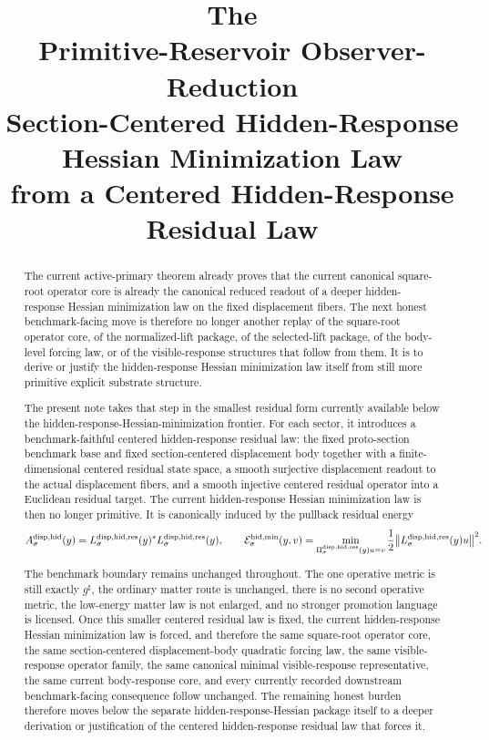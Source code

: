 \documentclass[11pt]{article}
\title{\textbf{The \TheoryName{}}\\[0.4em]
\large Primitive-Reservoir Observer-Reduction\\
\large Section-Centered Hidden-Response\\
\large Hessian Minimization Law\\
\large from a Centered Hidden-Response\\
\large Residual Law}
\author{}
\date{}
\newcommand{\CompletedMetric}{g^{\sharp}}
\newcommand{\HiddenHessian}[1]{A_{#1}^{\mathrm{disp,hid}}}
\newcommand{\HiddenMinEnergy}[1]{\mathcal E_{#1}^{\mathrm{hid,min}}}
\newcommand{\ResidualReadout}[1]{\Pi_{#1}^{\mathrm{disp,hid,res}}}
\newcommand{\ResidualOperator}[1]{L_{#1}^{\mathrm{disp,hid,res}}}
\begin{document}
\maketitle

\begin{abstract}
The current active-primary theorem already proves that the current canonical square-root operator core is already the canonical reduced readout of a deeper hidden-response Hessian minimization law on the fixed displacement fibers. The next honest benchmark-facing move is therefore no longer another replay of the square-root operator core, of the normalized-lift package, of the selected-lift package, of the body-level forcing law, or of the visible-response structures that follow from them. It is to derive or justify the hidden-response Hessian minimization law itself from still more primitive explicit substrate structure.

The present note takes that step in the smallest residual form currently available below the hidden-response-Hessian-minimization frontier. For each sector, it introduces a benchmark-faithful centered hidden-response residual law: the fixed proto-section benchmark base and fixed section-centered displacement body together with a finite-dimensional centered residual state space, a smooth surjective displacement readout to the actual displacement fibers, and a smooth injective centered residual operator into a Euclidean residual target. The current hidden-response Hessian minimization law is then no longer primitive. It is canonically induced by the pullback residual energy
\[
\HiddenHessian{\sigma}(y)
=
\ResidualOperator{\sigma}(y)^*
\ResidualOperator{\sigma}(y),
\qquad
\HiddenMinEnergy{\sigma}(y,v)
=
\min_{\ResidualReadout{\sigma}(y)u=v}
\frac{1}{2}
\norm{\ResidualOperator{\sigma}(y)u}^{2}.
\]

The benchmark boundary remains unchanged throughout. The one operative metric is still exactly \(\CompletedMetric\), the ordinary matter route is unchanged, there is no second operative metric, the low-energy matter law is not enlarged, and no stronger promotion language is licensed. Once this smaller centered residual law is fixed, the current hidden-response Hessian minimization law is forced, and therefore the same square-root operator core, the same section-centered displacement-body quadratic forcing law, the same visible-response operator family, the same canonical minimal visible-response representative, the same current body-response core, and every currently recorded downstream benchmark-facing consequence follow unchanged. The remaining honest burden therefore moves below the separate hidden-response-Hessian package itself to a deeper derivation or justification of the centered hidden-response residual law that forces it.
\end{abstract}
\end{document}
